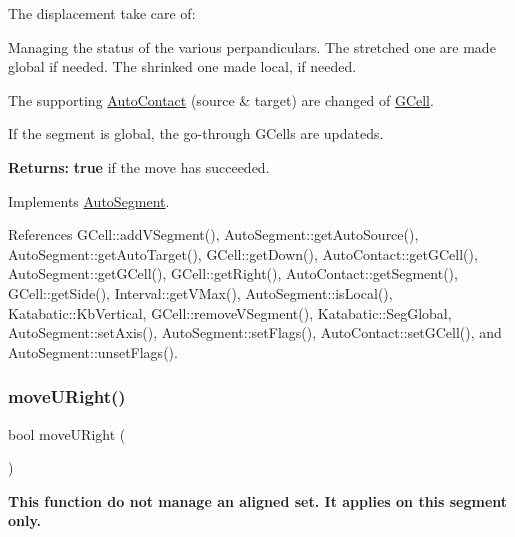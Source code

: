 The displacement take care of\+:
\begin{DoxyItemize}
\item Managing the status of the various perpandiculars. The stretched one are made global if needed. The shrinked one made local, if needed.
\item The supporting \mbox{\hyperlink{classKatabatic_1_1AutoContact}{Auto\+Contact}} (source \& target) are changed of \mbox{\hyperlink{classKatabatic_1_1GCell}{G\+Cell}}.
\item If the segment is global, the go-\/through G\+Cells are updateds.
\end{DoxyItemize}

{\bfseries Returns\+:} {\bfseries true} if the move has succeeded.

 

Implements \mbox{\hyperlink{classKatabatic_1_1AutoSegment_af8ca7b17e952f4b599aeeb2f4e5be395}{Auto\+Segment}}.



References G\+Cell\+::add\+V\+Segment(), Auto\+Segment\+::get\+Auto\+Source(), Auto\+Segment\+::get\+Auto\+Target(), G\+Cell\+::get\+Down(), Auto\+Contact\+::get\+G\+Cell(), Auto\+Segment\+::get\+G\+Cell(), G\+Cell\+::get\+Right(), Auto\+Contact\+::get\+Segment(), G\+Cell\+::get\+Side(), Interval\+::get\+V\+Max(), Auto\+Segment\+::is\+Local(), Katabatic\+::\+Kb\+Vertical, G\+Cell\+::remove\+V\+Segment(), Katabatic\+::\+Seg\+Global, Auto\+Segment\+::set\+Axis(), Auto\+Segment\+::set\+Flags(), Auto\+Contact\+::set\+G\+Cell(), and Auto\+Segment\+::unset\+Flags().

\mbox{\label{classKatabatic_1_1AutoHorizontal_aa469e37853e31f8b1bc817518c896d62}} 
\subsubsection{\texorpdfstring{move\+U\+Right()}{moveURight()}}
{\footnotesize\ttfamily bool move\+U\+Right (\begin{DoxyParamCaption}{ }\end{DoxyParamCaption})\hspace{0.3cm}{\ttfamily [virtual]}}

{\bfseries This function do not manage an aligned set. It applies on {\ttfamily this} segment only.}

